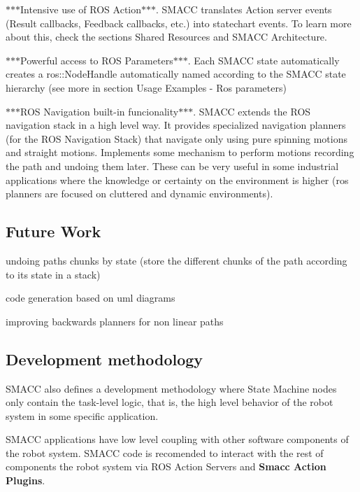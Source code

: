 \begin{DoxyItemize}
\item $\ast$$\ast$$\ast$\+Intensive use of R\+OS Action$\ast$$\ast$$\ast$. S\+M\+A\+CC translates Action server events (Result callbacks, Feedback callbacks, etc.) into statechart events. To learn more about this, check the sections Shared Resources and S\+M\+A\+CC Architecture.
\item $\ast$$\ast$$\ast$\+Powerful access to R\+OS Parameters$\ast$$\ast$$\ast$. Each S\+M\+A\+CC state automatically creates a ros\+::\+Node\+Handle automatically named according to the S\+M\+A\+CC state hierarchy (see more in section Usage Examples -\/ Ros parameters)
\item $\ast$$\ast$$\ast$\+R\+OS Navigation built-\/in funcionality$\ast$$\ast$$\ast$. S\+M\+A\+CC extends the R\+OS navigation stack in a high level way. It provides specialized navigation planners (for the R\+OS Navigation Stack) that navigate only using pure spinning motions and straight motions. Implements some mechanism to perform motions recording the path and undoing them later. These can be very useful in some industrial applications where the knowledge or certainty on the environment is higher (ros planners are focused on cluttered and dynamic environments).
\end{DoxyItemize}

\subsection*{Future Work}


\begin{DoxyItemize}
\item undoing paths chunks by state (store the different chunks of the path according to its state in a stack)
\item code generation based on uml diagrams
\item improving backwards planners for non linear paths
\end{DoxyItemize}

\subsection*{Development methodology}

S\+M\+A\+CC also defines a development methodology where State Machine nodes only contain the task-\/level logic, that is, the high level behavior of the robot system in some specific application.

S\+M\+A\+CC applications have low level coupling with other software components of the robot system. S\+M\+A\+CC code is recomended to interact with the rest of components the robot system via R\+OS Action Servers and {\bfseries Smacc Action Plugins}.

